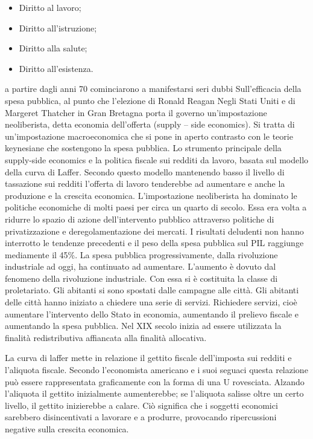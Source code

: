 \documentclass{report}
\begin{document}
\begin{itemize}
  \item Diritto al lavoro;
  \item Diritto all'istruzione;
  \item Diritto alla salute;
  \item Diritto all'esistenza.
\end{itemize}
a partire dagli anni 70 cominciarono a manifestarsi seri dubbi Sull'efficacia della spesa pubblica, al punto che l'elezione di Ronald Reagan Negli Stati Uniti e di Margeret Thatcher in Gran Bretagna porta il governo un'impostazione neoliberista, detta economia dell'offerta (supply – side economics). 
Si tratta di un'impostazione macroeconomica che si pone in aperto contrasto con le teorie keynesiane che sostengono la spesa pubblica.
Lo strumento principale della supply-side economics e la politica fiscale sui redditi da lavoro, basata sul modello della curva di Laffer. Secondo questo modello mantenendo basso il livello di tassazione sui redditi l'offerta di lavoro tenderebbe ad aumentare e anche la produzione e la crescita economica. 
L'impostazione neoliberista ha dominato le politiche economiche di molti paesi per circa un quarto di secolo. Essa era volta a ridurre lo spazio di azione dell'intervento pubblico attraverso politiche di privatizzazione e deregolamentazione dei mercati.
I risultati deludenti non hanno interrotto le tendenze precedenti e il peso della spesa pubblica sul PIL raggiunge mediamente il 45\%.
La spesa pubblica progressivamente, dalla rivoluzione industriale ad oggi, ha continuato ad aumentare. L’aumento è dovuto dal fenomeno della rivoluzione industriale. Con essa si è costituita la classe di proletariato. Gli abitanti si sono spostati dalle campagne alle città. Gli abitanti delle città hanno iniziato a chiedere una serie di servizi. Richiedere servizi, cioè aumentare l’intervento dello Stato in economia, aumentando il prelievo fiscale e aumentando la spesa pubblica. Nel XIX secolo inizia ad essere utilizzata la finalità redistributiva affiancata alla finalità allocativa. 

La curva di laffer mette in relazione il gettito fiscale dell'imposta sui redditi e l'aliquota fiscale.
Secondo l'economista americano e i suoi seguaci questa relazione può essere rappresentata graficamente con la forma di una U rovesciata. Alzando l'aliquota il gettito inizialmente aumenterebbe; se l'aliquota salisse oltre un certo livello, il gettito inizierebbe a calare.
Ciò significa che i soggetti economici sarebbero disincentivati a lavorare e a produrre, provocando ripercussioni negative sulla crescita economica.
\end{document}
